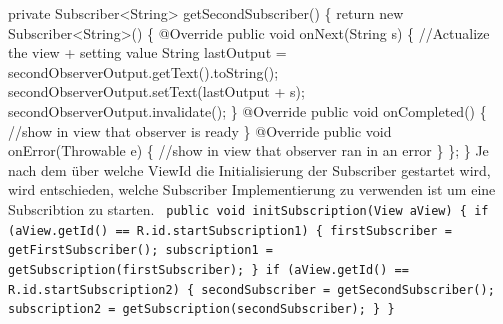 \documentclass[12pt,oneside,a4paper,bibtotoc,liststotoc]{scrreprt}
\begin{document}
{\newline
   private Subscriber<String> getSecondSubscriber() \{\newline
\newline
       return new Subscriber<String>() \{\newline
           @Override\newline
           public void onNext(String s) \{\newline
               //Actualize the view + setting value\newline
               String lastOutput = secondObserverOutput.getText().toString();\newline
               secondObserverOutput.setText(lastOutput + s);\newline
\newline
               secondObserverOutput.invalidate();\newline
           \}\newline
\newline
           @Override\newline
           public void onCompleted() \{\newline
               //show in view that observer is ready\newline
           \}\newline
\newline
           @Override\newline
           public void onError(Throwable e) \{\newline
               //show in view that observer ran in an error\newline
           \}\newline
       \};\newline
   \}\newline
   }\newline
Je nach dem über welche ViewId die Initialisierung der Subscriber gestartet wird, wird entschieden, welche Subscriber Implementierung zu verwenden ist um eine Subscribtion zu starten.\newline
\texttt{\newline
 public void initSubscription(View aView) \{\newline
       if (aView.getId() == R.id.startSubscription1) \{\newline
           firstSubscriber = getFirstSubscriber();\newline
           subscription1 = getSubscription(firstSubscriber);\newline
\newline
       \}\newline
       if (aView.getId() == R.id.startSubscription2) \{\newline
           secondSubscriber = getSecondSubscriber();\newline
\newline
           subscription2 = getSubscription(secondSubscriber);\newline
       \}\newline
   \}\newline
}\newline
\end{document}
